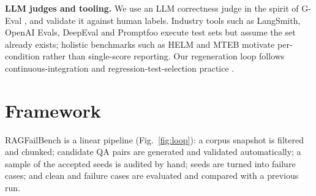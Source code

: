 \documentclass[conference]{IEEEtran}
\begin{document}
\textbf{LLM judges and tooling.} We use an LLM correctness judge in the spirit of G-Eval
\cite{liu2023geval}, and validate it against human labels. Industry tools such as LangSmith,
OpenAI Evals, DeepEval and Promptfoo \cite{langsmith,openaievals,deepeval,promptfoo} execute
test sets but assume the set already exists; holistic benchmarks such as HELM and MTEB
\cite{liang2022helm,muennighoff2023mteb} motivate per-condition rather than single-score
reporting. Our regeneration loop follows continuous-integration and regression-test-selection
practice \cite{fowler2006ci,rothermel1996regression}.

\begin{table}[t]
\centering
\caption{Capability comparison with prior RAG evaluation systems.}
\label{tab:compare}
\footnotesize
{}
\end{table}

\section{Framework}
\label{sec:framework}
RAGFailBench is a linear pipeline (Fig.~\ref{fig:loop}): a corpus snapshot is filtered and
chunked; candidate QA pairs are generated and validated automatically; a sample of the
accepted seeds is audited by hand; seeds are turned into failure cases; and clean and failure
cases are evaluated and compared with a previous run.
\end{document}
